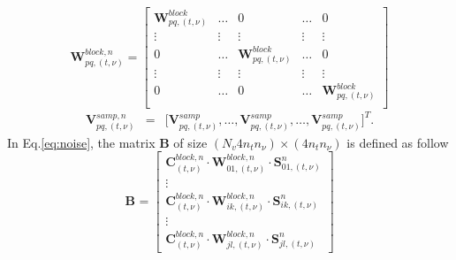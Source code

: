\documentclass[useAMS,usenatbib]{mn2e}
\begin{document}
\begin{equation*}
\mathbf{W}_{pq,(t,\nu)}^{block,n}=
  \begin{bmatrix}
    \mathbf{W}_{pq,(t,\nu)}^{block} &\dots & 0 & \dots & 0\\
    \vdots & \vdots & \vdots & \vdots & \vdots\\
    0 & \dots& \mathbf{W}_{pq,(t,\nu)}^{block} &\dots & 0\\
    \vdots & \vdots & \vdots & \vdots & \vdots \\
    0 & \dots& 0 &\dots & \mathbf{W}_{pq,(t,\nu)}^{block}\\
  \end{bmatrix}
\end{equation*}
\begin{eqnarray*}
\mathbf{V}_{pq,(t,\nu)}^{samp,n}&=&\Bigg[\mathbf{V}_{pq,(t,\nu)}^{samp},\dots, \mathbf{V}_{pq,(t,\nu)}^{samp}, \dots,
\mathbf{V}_{pq,(t,\nu)}^{samp}\Bigg]^T. 
\end{eqnarray*}
In Eq.\ref{eq:noise}, the matrix $\mathbf{B}$ of size $(N_v 4 n_t n_{\nu})\times (4 n_t n_{\nu})$ is defined as follow
\begin{equation*}
\mathbf{B}_{}=
  \begin{bmatrix}
    \mathbf{C}_{(t,\nu)}^{block,n}\cdot \mathbf{W}_{01,(t,\nu)}^{block,n}\cdot \mathbf{S}_{01,(t,\nu)}^{n}\\
    \vdots\\
    \mathbf{C}_{(t,\nu)}^{block,n}\cdot \mathbf{W}_{ik,(t,\nu)}^{block,n}\cdot \mathbf{S}_{ik,(t,\nu)}^{n}\\
    \vdots \\
    \mathbf{C}_{(t,\nu)}^{block,n}\cdot \mathbf{W}_{jl,(t,\nu)}^{block,n}\cdot \mathbf{S}_{jl,(t,\nu)}^{n}
  \end{bmatrix}
\end{equation*}
\end{document}
